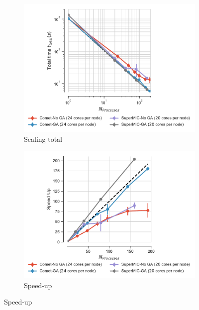 \begin{figure}[ht!]
\centering
\begin{subfigure}{.4\textwidth}
  \includegraphics[width=\linewidth]{figures/Comparison_t-tot-clusters_Splitting.pdf}
  \caption{Scaling total}
  \label{fig:MPIscaling-clusters-splitting}
\end{subfigure}
\hfill
\begin{subfigure}{.4\textwidth}
  \includegraphics[width=\linewidth]{figures/Comparison_speed-up-clusters_Splitting.pdf}
  \caption{Speed-up}
  \label{fig:MPIspeedup-clusters-splitting}
\end{subfigure}
\bigskip


\end{figure}

